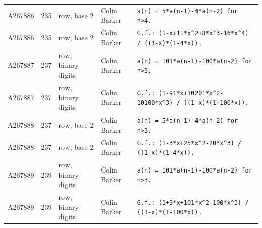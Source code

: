 \documentclass[11pt]{article}
\theoremstyle{definition}
\theoremstyle{remark}
\begin{document}
{\begin{longtable}{p{1.3cm}p{0.7cm}p{2.4cm}p{2.3cm}p{7.3cm}}
A267886 & 235 & row, base 2 & Colin Barker & \texttt{a(n)\allowbreak{} \allowbreak{}=\allowbreak{} \allowbreak{}5*\allowbreak{}a(n-\allowbreak{}1)\allowbreak{}-\allowbreak{}4*\allowbreak{}a(n-\allowbreak{}2)\allowbreak{} \allowbreak{}for \allowbreak{}n>4.} \\
A267886 & 235 & row, base 2 & Colin Barker & \texttt{G.f.: \allowbreak{}(1-\allowbreak{}x+\allowbreak{}11*\allowbreak{}x\^{}2+\allowbreak{}8*\allowbreak{}x\^{}3-\allowbreak{}16*\allowbreak{}x\^{}4)\allowbreak{} \allowbreak{}/\allowbreak{} \allowbreak{}((1-\allowbreak{}x)\allowbreak{}*\allowbreak{}(1-\allowbreak{}4*\allowbreak{}x)\allowbreak{})\allowbreak{}.} \\
A267887 & 237 & row, binary digits & Colin Barker & \texttt{a(n)\allowbreak{} \allowbreak{}=\allowbreak{} \allowbreak{}101*\allowbreak{}a(n-\allowbreak{}1)\allowbreak{}-\allowbreak{}100*\allowbreak{}a(n-\allowbreak{}2)\allowbreak{} \allowbreak{}for \allowbreak{}n>3.} \\
A267887 & 237 & row, binary digits & Colin Barker & \texttt{G.f.: \allowbreak{}(1-\allowbreak{}91*\allowbreak{}x+\allowbreak{}10201*\allowbreak{}x\^{}2-\allowbreak{}10100*\allowbreak{}x\^{}3)\allowbreak{} \allowbreak{}/\allowbreak{} \allowbreak{}((1-\allowbreak{}x)\allowbreak{}*\allowbreak{}(1-\allowbreak{}100*\allowbreak{}x)\allowbreak{})\allowbreak{}.} \\
A267888 & 237 & row, base 2 & Colin Barker & \texttt{a(n)\allowbreak{} \allowbreak{}=\allowbreak{} \allowbreak{}5*\allowbreak{}a(n-\allowbreak{}1)\allowbreak{}-\allowbreak{}4*\allowbreak{}a(n-\allowbreak{}2)\allowbreak{} \allowbreak{}for \allowbreak{}n>3.} \\
A267888 & 237 & row, base 2 & Colin Barker & \texttt{G.f.: \allowbreak{}(1-\allowbreak{}3*\allowbreak{}x+\allowbreak{}25*\allowbreak{}x\^{}2-\allowbreak{}20*\allowbreak{}x\^{}3)\allowbreak{} \allowbreak{}/\allowbreak{} \allowbreak{}((1-\allowbreak{}x)\allowbreak{}*\allowbreak{}(1-\allowbreak{}4*\allowbreak{}x)\allowbreak{})\allowbreak{}.} \\
A267889 & 239 & row, binary digits & Colin Barker & \texttt{a(n)\allowbreak{} \allowbreak{}=\allowbreak{} \allowbreak{}101*\allowbreak{}a(n-\allowbreak{}1)\allowbreak{}-\allowbreak{}100*\allowbreak{}a(n-\allowbreak{}2)\allowbreak{} \allowbreak{}for \allowbreak{}n>3.} \\
A267889 & 239 & row, binary digits & Colin Barker & \texttt{G.f.: \allowbreak{}(1+\allowbreak{}9*\allowbreak{}x+\allowbreak{}101*\allowbreak{}x\^{}2-\allowbreak{}100*\allowbreak{}x\^{}3)\allowbreak{} \allowbreak{}/\allowbreak{} \allowbreak{}((1-\allowbreak{}x)\allowbreak{}*\allowbreak{}(1-\allowbreak{}100*\allowbreak{}x)\allowbreak{})\allowbreak{}.} \\

\end{longtable}}
\end{document}
